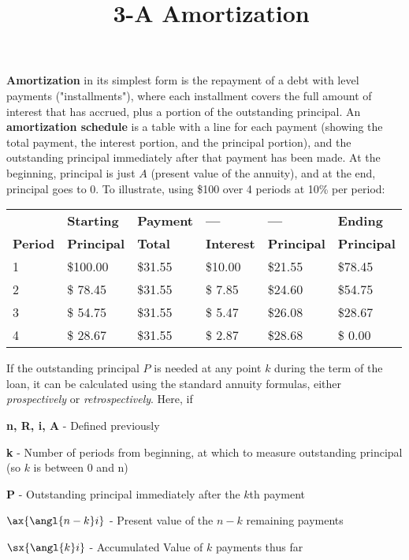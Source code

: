 \documentclass[12pt]{article}
\title{\normalfont\ 3-A Amortization} %
\author{} %
\date{}  %
\begin{document}

\maketitle %
\vspace{-1.3in}

\begin{flushleft}
    \textbf{Amortization} in its simplest form is the repayment of a debt with level payments ("installments"),
    where each installment covers the full amount of interest that has accrued, plus a portion of the outstanding
    principal.  An \textbf{amortization schedule} is a table with a line for each payment (showing the
    total payment, the interest portion, and the principal portion), and the outstanding principal immediately after
    that payment has been made.  At the beginning, principal is just $ A $ (present value of the annuity), and at
    the end, principal goes to 0.  To illustrate, using \$100 over 4 periods at 10\% per period:
\end{flushleft}

\begin{tabular}{@{ } l l  l  l l l @{ }}    %
    \toprule
    {\bfseries       }&{\bfseries Starting }&{\bfseries Payment}&{\bfseries ---}&{\bfseries ---}&{\bfseries Ending} \\
    {\bfseries Period}&{\bfseries Principal}&{\bfseries Total}&{\bfseries Interest}&{\bfseries Principal}&{\bfseries Principal} \\
    \cmidrule(lr){1-6}
    1 & \$100.00  & \$31.55 &\$10.00 &\$21.55 &\$78.45 \\
    2 & \$ 78.45  & \$31.55 &\$ 7.85 &\$24.60 &\$54.75 \\
    3 & \$ 54.75  & \$31.55 &\$ 5.47 &\$26.08 &\$28.67 \\
    4 & \$ 28.67  & \$31.55 &\$ 2.87 &\$28.68 &\$ 0.00 \\
    \bottomrule
\end{tabular}

\begin{flushleft}
    If the outstanding principal $ P $ is needed at any point $ k $ during the term of
    the loan, it can be calculated using the standard annuity formulas, either \textit{prospectively} or
    \textit{retrospectively}.  Here, if
\end{flushleft}

\begin{description}
    \item\textbf{n, R, i, A} - Defined previously
    \item\textbf{k    } - Number of periods from beginning, at which to measure outstanding principal (so $ k $ is between 0 and n)
    \item\textbf{P    } - Outstanding principal immediately after the $ k $th payment
    \item\textbf{{$ \ax{ \angl{n-k} i} $}} - Present value of the $ n-k $ remaining payments
    \item\textbf{{$ \sx{ \angl{k} i} $}} - Accumulated Value of $ k $ payments thus far
\end{description}
\end{document}
